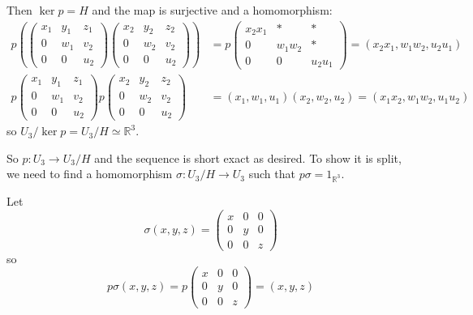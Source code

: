 \documentclass[12pt]{article}
\newcommand{\R}{\mathbb{R}}
\begin{document}
        Then $\ker p = H$ and the map is surjective and a homomorphism:
        \begin{align*}
            p\left(\begin{pmatrix}
                x_1 & y_1 & z_1\\ 
                0 & w_1 & v_2\\ 
                0 & 0 & u_2
            \end{pmatrix}\begin{pmatrix}
                x_2 & y_2 & z_2\\ 
                0 & w_2 & v_2\\ 
                0 & 0 & u_2
            \end{pmatrix}\right) &= p \begin{pmatrix}
                x_2x_1 & * & *\\ 
                0 & w_1w_2 & *\\
                0 & 0 & u_2u_1
            \end{pmatrix} = (x_2x_1, w_1w_2, u_2u_1)\\
            p\begin{pmatrix}
                x_1 & y_1 & z_1\\ 
                0 & w_1 & v_2\\ 
                0 & 0 & u_2
            \end{pmatrix}p\begin{pmatrix}
                x_2 & y_2 & z_2\\ 
                0 & w_2 & v_2\\ 
                0 & 0 & u_2 
            \end{pmatrix} &= (x_1, w_1, u_1)(x_2, w_2, u_2) = (x_1x_2, w_1w_2, u_1u_2)
        \end{align*}
        so $U_3/\ker p = U_3/H \simeq \R^3$. 

        So $p: U_3 \to U_3/H$ and the sequence is short exact as desired. To show it is split, we need to find a homomorphism $\sigma: U_3/H \to U_3$ such that $p\sigma = \text{1}_{\R^3}$.

        Let 
        \[\sigma(x, y, z) = \begin{pmatrix}
            x & 0 & 0\\
            0 & y & 0\\
            0 & 0 & z
        \end{pmatrix}\]
        so 
        \[p\sigma(x, y, z) = p\begin{pmatrix}
            x & 0 & 0\\
            0 & y & 0\\
            0 & 0 & z
        \end{pmatrix} = (x, y, z)\]
\end{document}
